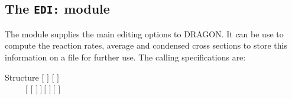 \subsection{The {\tt EDI:} module}\label{sect:EDIData}

The  module supplies the main editing options to DRAGON. It can be
use to compute the reaction rates, average and condensed cross sections to store
this information on a file for further use. The calling specifications are:

\begin{DataStructure}{Structure }
 \moc{:=}  $[$  $]$
 $[$   $]$ \\
~~~~~$[$  $[$  $]~]~[$  $]~[$  $]$ \moc{::} 
\end{DataStructure}

